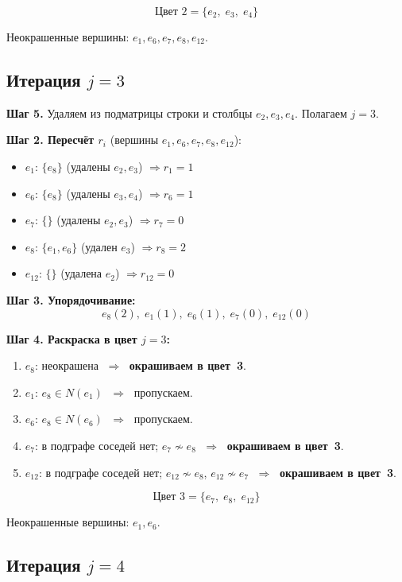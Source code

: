 \documentclass[a4paper,12pt]{article}
\begin{document}
\[
	\boxed{\text{Цвет~2} = \{e_2,\; e_3,\; e_4\}}
\]

Неокрашенные вершины: $e_1, e_6, e_7, e_8, e_{12}$.

\subsection*{Итерация $j = 3$}

\textbf{Шаг 5.} Удаляем из подматрицы строки и столбцы $e_2, e_3, e_4$. Полагаем $j = 3$.

\textbf{Шаг 2. Пересчёт $r_i$} (вершины $e_1, e_6, e_7, e_8, e_{12}$):

\begin{itemize}
	\item $e_1$: $\{e_8\}$ (удалены $e_2, e_3$) $\Rightarrow r_1 = 1$
	\item $e_6$: $\{e_8\}$ (удалены $e_3, e_4$) $\Rightarrow r_6 = 1$
	\item $e_7$: $\{\}$ (удалены $e_2, e_3$) $\Rightarrow r_7 = 0$
	\item $e_8$: $\{e_1, e_6\}$ (удален $e_3$) $\Rightarrow r_8 = 2$
	\item $e_{12}$: $\{\}$ (удалена $e_2$) $\Rightarrow r_{12} = 0$
\end{itemize}

\textbf{Шаг 3. Упорядочивание:}
\[
	e_8(2),\; e_1(1),\; e_6(1),\; e_7(0),\; e_{12}(0)
\]

\textbf{Шаг 4. Раскраска в цвет $j = 3$:}

\begin{enumerate}
	\item $e_8$: неокрашена $\;\Rightarrow\;$ \textbf{окрашиваем в цвет~3}.
	\item $e_1$: $e_8 \in N(e_1)$ $\;\Rightarrow\;$ пропускаем.
	\item $e_6$: $e_8 \in N(e_6)$ $\;\Rightarrow\;$ пропускаем.
	\item $e_7$: в подграфе соседей нет; $e_7 \not\sim e_8$
	      $\;\Rightarrow\;$ \textbf{окрашиваем в цвет~3}.
	\item $e_{12}$: в подграфе соседей нет; $e_{12} \not\sim e_8$, $e_{12} \not\sim e_7$
	      $\;\Rightarrow\;$ \textbf{окрашиваем в цвет~3}.
\end{enumerate}

\[
	\boxed{\text{Цвет~3} = \{e_7,\; e_8,\; e_{12}\}}
\]

Неокрашенные вершины: $e_1, e_6$.

\subsection*{Итерация $j = 4$}
\end{document}
